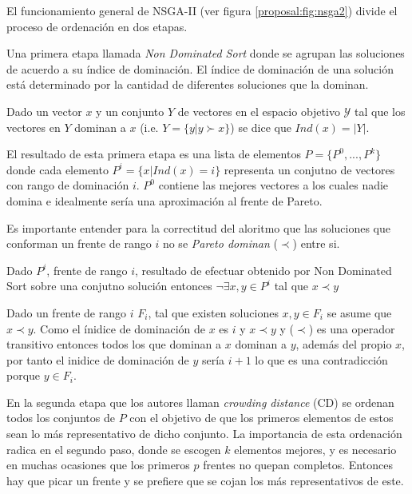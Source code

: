 El funcionamiento general de NSGA-II (ver figura \ref{proposal:fig:nsga2}) divide el proceso de ordenaci\'on en dos etapas.

Una primera etapa llamada \textit{Non Dominated Sort} donde se agrupan las soluciones de acuerdo a su \'indice de dominaci\'on. El \'indice de dominaci\'on de una soluci\'on est\'a determinado por la cantidad de diferentes soluciones que la dominan.
\begin{definition}
    \label{proposal:def:domination_index}
    Dado un vector $x$ y un conjunto $Y$ de vectores en el espacio objetivo $\mathcal{Y}$ tal que los vectores en $Y$ dominan a $x$ (i.e. $Y = \{y | y \succ x\}$) se dice que $Ind(x) = |Y|$.
\end{definition}
El resultado de esta primera etapa es una lista de elementos $P = \{P^0, ..., P^k\}$ donde cada elemento $P^i = \{x | Ind(x) = i\}$ representa un conjutno de vectores con rango de dominaci\'on $i$. $P^0$ contiene las mejores vectores a los cuales nadie domina e idealmente ser\'ia una aproximaci\'on al frente de Pareto.

Es importante entender para la correctitud del aloritmo  que las soluciones que conforman un frente de rango $i$ no se \textit{Pareto dominan} ($\prec$) entre si.
\begin{theorem}
Dado $P^i$, frente de rango $i$, resultado de efectuar obtenido por Non Dominated Sort sobre una conjutno soluci\'on entonces $\neg \exists x, y \in P^i$ tal que $x \prec y$
\end{theorem}
Dado un frente de rango $i$ $F_i$, tal que existen soluciones $x, y \in F_i$ se asume que $x \prec y$. Como el \'inidice de dominaci\'on de $x$ es $i$ y $x \prec y$ y ($\prec$) es una operador transitivo entonces todos los que dominan a $x$ dominan a $y$, adem\'as del propio $x$, por tanto el inidice de dominaci\'on de $y$ ser\'ia $i+1$ lo que es una contradicci\'on porque $y \in F_i$. 

En la segunda etapa que los autores llaman \textit{crowding distance} (CD) se ordenan todos los conjuntos de $P$ con el objetivo de que los primeros elementos de estos sean lo m\'as representativo de dicho conjunto. La importancia de esta ordenaci\'on radica en el segundo paso, donde se escogen $k$ elementos mejores, y es necesario en muchas ocasiones que los primeros $p$ frentes no quepan completos. Entonces hay que picar un frente y se prefiere que se cojan los m\'as representativos de este.

